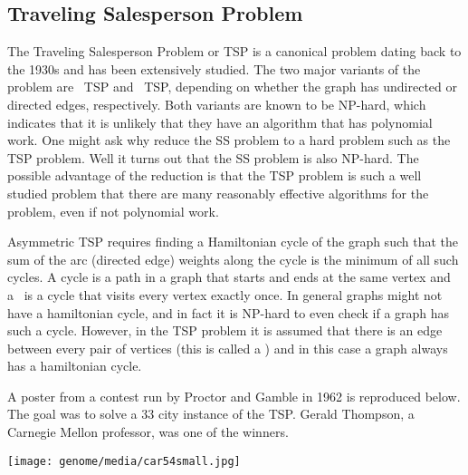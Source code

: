 \subsection{Traveling Salesperson Problem}
\label{sec:genome::traveling-salesperson-problem}

\begin{cluster}
\label{grp:grm:genome::traveling}

\begin{gram}
\label{grm:genome::traveling}
The Traveling Salesperson Problem or TSP is a canonical 
problem dating back to the 1930s and has been extensively studied.
The two major variants of the problem are~ TSP
and~ TSP, depending on whether the graph has
undirected or directed edges, respectively.
Both variants are known to be NP-hard, which indicates that it is
unlikely that they have an algorithm that has polynomial work.
One might ask why reduce the SS problem to a hard problem such as the
TSP problem.   Well it turns out that the SS problem is also NP-hard.    The
possible advantage of the reduction is that the TSP problem is such a
well studied problem that there are many reasonably effective
algorithms for the problem, even if not polynomial work.

\end{gram}
\end{cluster}

\begin{cluster}
\label{grp:grm:genome::asymmetric}

\begin{gram}
\label{grm:genome::asymmetric}
Asymmetric TSP requires finding a Hamiltonian cycle of the
graph such that the sum of the arc (directed edge) weights along the
cycle is the minimum of all such cycles.
A cycle is a path in a graph that starts and ends at the
same vertex and a~ is a cycle that visits
every vertex exactly once.
In general graphs might not have a hamiltonian cycle, and in fact it
is NP-hard to even check if a graph has such a cycle.    However, in
the TSP problem it is assumed that there is an edge between every
pair of vertices (this is called a ) 
and in this case a graph always has a hamiltonian cycle.

\end{gram}
\end{cluster}

\begin{cluster}
\label{grp:xmpl:genome::tsp-competition}

\begin{example}
\label{xmpl:genome::tsp-competition}
A poster from a contest run by Proctor and Gamble in 1962 is
reproduced below.  The goal was to solve a 33 city instance of the
TSP.  Gerald Thompson, a Carnegie Mellon professor, was one of the
winners.

\begin{center}
\texttt{[image: genome/media/car54small.jpg]}
\end{center}

\end{example}
\end{cluster}

